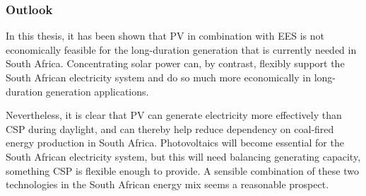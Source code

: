\subsubsection{Outlook}

In this thesis, it has been shown that PV in combination with EES is not economically feasible for the long-duration generation that is currently needed in South Africa. Concentrating solar power can, by contrast, flexibly support the South African electricity system and do so much more economically in long-duration generation applications. 


Nevertheless, it is clear that PV can generate electricity more effectively than CSP during daylight, and can thereby help reduce dependency on coal-fired energy production in South Africa. Photovoltaics will become essential for the South African electricity system, but this will need balancing generating capacity, something CSP is flexible enough to provide. A sensible combination of these two technologies in the South African energy mix seems a reasonable prospect.

\clearpage